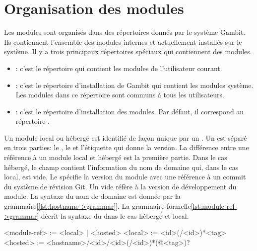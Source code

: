 \section{Organisation des modules}

Les modules sont organisés dans des répertoires donnés par le système Gambit.
Ils contiennent l'ensemble des modules internes et actuellement installés sur
le système. Il y a trois principaux répertoires spéciaux qui contiennent des
modules.

\begin{itemize}
  \item {}: c'est le répertoire qui contient les modules
    de l'utilisateur courant.

  \item {}: c'est le répertoire d'installation de Gambit
    qui contient les modules système. Les modules dans ce répertoire sont
    communs à tous les utilisateurs.

  \item {}: c'est le répertoire d'installation des modules.
    Par défaut, il correspond au répertoire .
\end{itemize}

Un module local ou hébergé est identifié de façon unique par un
.  Un  est séparé en trois parties: le
, le  et l'étiquette qui donne la version.  La
différence entre une référence à un module local et hébergé est la première
partie. Dans le cas hébergé, le champ  contient
l'information du nom de domaine qui, dans le cas local, est vide.
Le  spécifie la version du module avec une référence à
un commit du système de révision Git. Un  vide réfère
à la version de développement du module.  La syntaxe du
nom de domaine est donnée par la grammaire[\ref{lst:hostname->grammar}].  La
grammaire formelle\ref{lst:module-ref->grammar} décrit la syntaxe du
 dans le cas hébergé et local.\\

\begin{center}
  \begin{mplisting}{0.8}
<module-ref> := <local> | <hosted>
<local>      := <id>(/<id>)*<tag>
<hosted>     := <hostname>/<id>/<id>(/<id>)*(@<tag>)?
\end{mplisting}
  \label{lst:module-ref->grammar}
\end{center}

